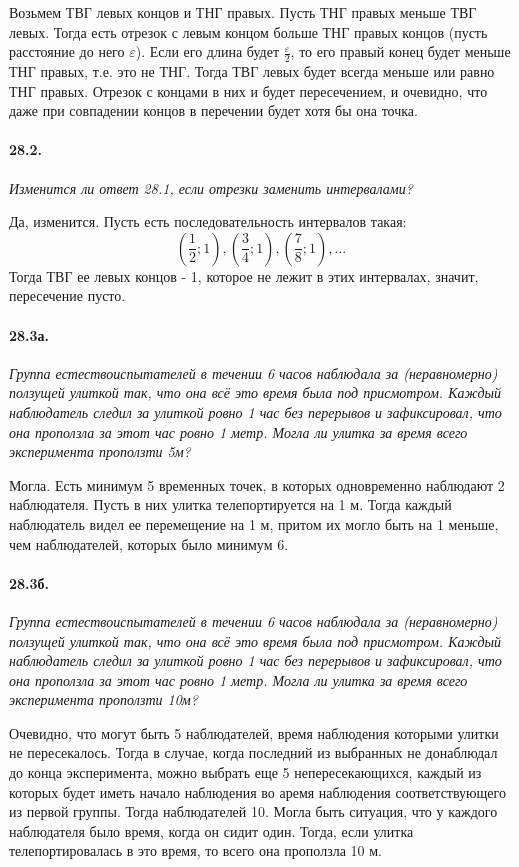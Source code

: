 \documentclass{book}
\begin{document}
Возьмем ТВГ левых концов и ТНГ правых. Пусть ТНГ правых меньше ТВГ левых. Тогда есть отрезок с левым концом больше ТНГ правых концов (пусть расстояние до него $\varepsilon$). Если его длина будет $\frac{\varepsilon}{2}$, то его правый конец будет меньше ТНГ правых, т.е. это не ТНГ. Тогда ТВГ левых будет всегда меньше или равно ТНГ правых. Отрезок с концами в них и будет пересечением, и очевидно, что даже при совпадении концов в перечении будет хотя бы она точка.

\paragraph{28.2.}
\textit{Изменится ли ответ 28.1, если отрезки заменить интервалами?}

Да, изменится. Пусть есть последовательность интервалов такая:
\[(\frac{1}{2}; 1), (\frac{3}{4}; 1), (\frac{7}{8}; 1), ...\] Тогда ТВГ ее левых концов - 1, которое не лежит в этих интервалах, значит, пересечение пусто.

\paragraph{28.3а.}
\textit{Группа естествоиспытателей в течении 6 часов наблюдала за (неравномерно)
ползущей улиткой так, что она всё это время была под присмотром. Каждый наблюдатель
следил за улиткой ровно 1 час без перерывов и зафиксировал, что она проползла за этот
час ровно 1 метр. Могла ли улитка за время всего эксперимента проползти 5м?}

Могла. Есть минимум 5 временных точек, в которых одновременно наблюдают 2 наблюдателя. Пусть в них улитка телепортируется на 1 м. Тогда каждый наблюдатель видел ее перемещение на 1 м, притом их могло быть на 1 меньше, чем наблюдателей, которых было минимум 6.

\paragraph{28.3б.}
\textit{Группа естествоиспытателей в течении 6 часов наблюдала за (неравномерно)
ползущей улиткой так, что она всё это время была под присмотром. Каждый наблюдатель
следил за улиткой ровно 1 час без перерывов и зафиксировал, что она проползла за этот
час ровно 1 метр. Могла ли улитка за время всего эксперимента проползти 10м?}

Очевидно, что могут быть 5 наблюдателей, время наблюдения которыми улитки не пересекалось. Тогда в случае, когда последний из выбранных не донаблюдал до конца эксперимента, можно выбрать еще 5 непересекающихся, каждый из которых будет иметь начало наблюдения во аремя наблюдения соответствующего из первой группы. Тогда наблюдателей 10. Могла быть ситуация, что у каждого наблюдателя было время, когда он сидит один. Тогда, если улитка телепортировалась в это время, то всего она проползла 10 м.
\end{document}

